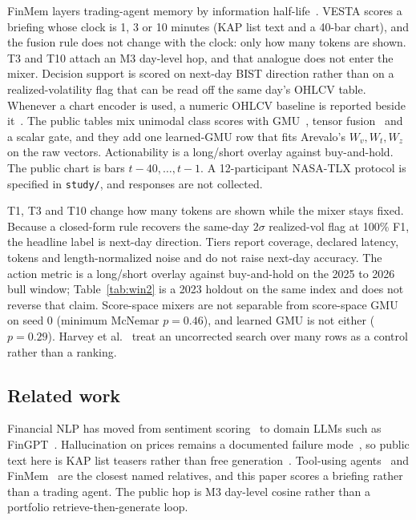 \documentclass{llncs}
\begin{document}
FinMem layers trading-agent memory by information half-life~\cite{yu2024finmem}. VESTA scores a briefing whose clock is 1, 3 or 10 minutes (KAP list text and a 40-bar chart), and the fusion rule does not change with the clock: only how many tokens are shown. T3 and T10 attach an M3 day-level hop, and that analogue does not enter the mixer. Decision support is scored on next-day BIST direction rather than on a realized-volatility flag that can be read off the same day's OHLCV table. Whenever a chart encoder is used, a numeric OHLCV baseline is reported beside it~\cite{jiang2023reimagining}. The public tables mix unimodal class scores with GMU~\cite{arevalo2017gmu}, tensor fusion~\cite{zadeh2017tfn} and a scalar gate, and they add one learned-GMU row that fits Arevalo's $W_v,W_t,W_z$ on the raw vectors. Actionability is a long/short overlay against buy-and-hold. The public chart is bars $t-40,\ldots,t-1$. A 12-participant NASA-TLX protocol is specified in \texttt{study/}, and responses are not collected.

T1, T3 and T10 change how many tokens are shown while the mixer stays fixed. Because a closed-form rule recovers the same-day $2\sigma$ realized-vol flag at 100\% F1, the headline label is next-day direction. Tiers report coverage, declared latency, tokens and length-normalized noise and do not raise next-day accuracy. The action metric is a long/short overlay against buy-and-hold on the 2025 to 2026 bull window; Table~\ref{tab:win2} is a 2023 holdout on the same index and does not reverse that claim. Score-space mixers are not separable from score-space GMU on seed 0 (minimum McNemar $p=0.46$), and learned GMU is not either ($p=0.29$). Harvey et al.~\cite{harvey2016and} treat an uncorrected search over many rows as a control rather than a ranking.

\subsection{Related work}
Financial NLP has moved from sentiment scoring~\cite{sohangir2018big} to domain LLMs such as FinGPT~\cite{yang2023fingpt}. Hallucination on prices remains a documented failure mode~\cite{kang2023deficiency}, so public text here is KAP list teasers rather than free generation~\cite{lewis2020rag}. Tool-using agents~\cite{yao2023react} and FinMem~\cite{yu2024finmem} are the closest named relatives, and this paper scores a briefing rather than a trading agent. The public hop is M3 day-level cosine rather than a portfolio retrieve-then-generate loop.
\end{document}
